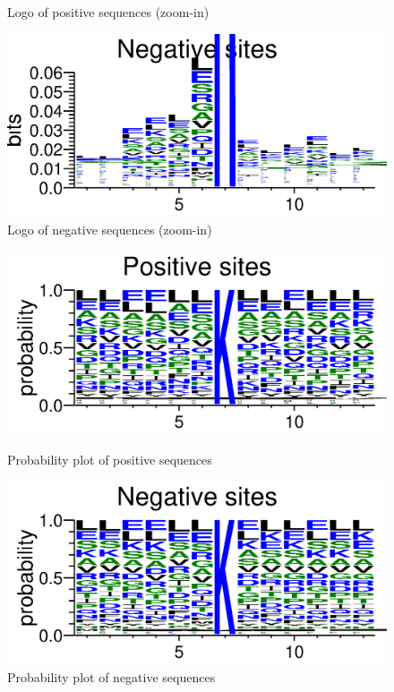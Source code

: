 \documentclass{article}
\begin{document}
\begin{enumerate}
\begin{figure}[htbp]
{            \caption{Logo of positive sequences (zoom-in)}
            \label{fig:pos-zoom}
        }
        \hfill
        \parbox{0.5\linewidth}{
            \centering
            \includegraphics[width=\linewidth]{images/negative_logo_zoom.png}
            \caption{Logo of negative sequences (zoom-in)}
            \label{fig:neg-zoom}
        }
    \end{figure}
    \begin{figure}[htbp]
        \parbox{0.5\linewidth}{
            \centering
            \includegraphics[width=\linewidth]{images/positive_prob.png}
            \caption{Probability plot of positive sequences}
            \label{fig:pos-prob}
        }
        \hfill
        \parbox{0.5\linewidth}{
            \centering
            \includegraphics[width=\linewidth]{images/negative_prob.png}
            \caption{Probability plot of negative sequences}
            \label{fig:neg-prob}
        }
    \end{figure}



\end{enumerate}
\end{document}
